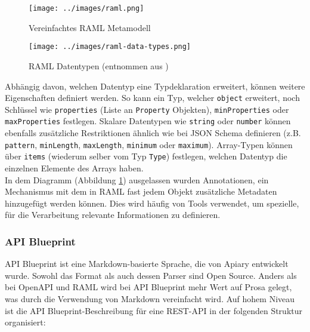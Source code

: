 \begin{figure}[H]
  \texttt{[image: ../images/raml.png]}
  \caption{Vereinfachtes RAML Metamodell}
  \label{fig:raml}
\end{figure}

\begin{figure}[H]
  \texttt{[image: ../images/raml-data-types.png]}
  \caption{RAML Datentypen (entnommen aus \cite{ramlspec})}
\end{figure}

Abhängig davon, welchen Datentyp eine Typdeklaration erweitert, können weitere Eigenschaften definiert werden. So kann ein Typ, welcher \lstinline|object| erweitert, noch Schlüssel wie \lstinline|properties| (Liste an \lstinline|Property| Objekten), \lstinline|minProperties| oder \lstinline|maxProperties| festlegen. Skalare Datentypen wie \lstinline|string| oder \lstinline|number| können ebenfalls zusätzliche Restriktionen ähnlich wie bei JSON Schema definieren (z.B. \lstinline|pattern|, \lstinline|minLength|, \lstinline|maxLength|, \lstinline|minimum| oder \lstinline|maximum|). Array-Typen können über \lstinline|items| (wiederum selber vom Typ \lstinline|Type|) festlegen, welchen Datentyp die einzelnen Elemente des Arrays haben. \\

In dem Diagramm (Abbildung \ref{fig:raml}) ausgelassen wurden Annotationen, ein Mechanismus mit dem in RAML fast jedem Objekt zusätzliche Metadaten hinzugefügt werden können. Dies wird häufig von Tools verwendet, um spezielle, für die Verarbeitung relevante Informationen zu definieren.

\subsubsection{API Blueprint}

API Blueprint ist eine Markdown-basierte Sprache, die von Apiary entwickelt wurde. Sowohl das Format als auch dessen Parser sind Open Source. Anders als bei OpenAPI und RAML wird bei API Blueprint mehr Wert auf Prosa gelegt, was durch die Verwendung von Markdown vereinfacht wird. Auf hohem Niveau ist die API Blueprint-Beschreibung für eine REST-API in der folgenden Struktur organisiert: \\

